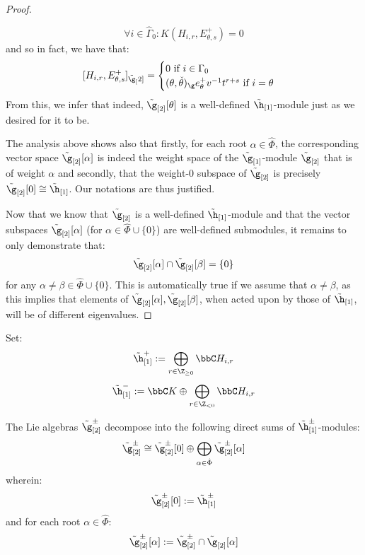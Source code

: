 \begin{proof}
\begin{itemize}
                        $$\forall i \in \hat{\Gamma}_0: K(H_{i, r}, E_{\theta, s}^+) = 0$$
                    and so in fact, we have that:
                        $$
                            [H_{i, r}, E_{\theta, s}^+]_{\tilde{\g}_[2]}
                            =
                            \begin{cases}
                                \text{$0$ if $i \in \Gamma_0$}
                                \\
                                \text{$(\theta, \check{\theta})_{\g} e_{\theta}^+ v^{-1} t^{r + s}$ if $i = \theta$}
                            \end{cases}
                        $$
                    From this, we infer that indeed, $\tilde{\g}_{[2]}[\theta]$ is a well-defined $\tilde{\h}_{[1]}$-module just as we desired for it to be. 
                \end{itemize}

                The analysis above shows also that firstly, for each root $\alpha \in \hat{\Phi}$, the corresponding vector space $\tilde{\g}_{[2]}[\alpha]$ is indeed the weight space of the $\tilde{\g}_{[1]}$-module $\tilde{\g}_{[2]}$ that is of weight $\alpha$ and secondly, that the weight-$0$ subspace of $\tilde{\g}_{[2]}$ is precisely $\tilde{\g}_{[2]}[0] \cong \tilde{\h}_{[1]}$. Our notations are thus justified. 

                Now that we know that $\tilde{\g}_{[2]}$ is a well-defined $\tilde{\h}_{[1]}$-module and that the vector subspaces $\tilde{\g}_{[2]}[\alpha]$ (for $\alpha \in \hat{\Phi} \cup \{0\}$) are well-defined submodules, it remains to only demonstrate that:
                    $$\tilde{\g}_{[2]}[\alpha] \cap \tilde{\g}_{[2]}[\beta] = \{0\}$$
                for any $\alpha \not = \beta \in \hat{\Phi} \cup \{0\}$. This is automatically true if we assume that $\alpha \not = \beta$, as this implies that elements of $\tilde{\g}_{[2]}[\alpha], \tilde{\g}_{[2]}[\beta]$, when acted upon by those of $\tilde{\h}_{[1]}$, will be of different eigenvalues.
            \end{proof}
        \begin{corollary} \label{coro: root_space_decomposition_for_toroidal_lie_algebras}
            Set:
                $$\tilde{\h}_{[1]}^+ := \bigoplus_{r \in \Z_{\geq 0}} \bbC H_{i, r}$$
                $$\tilde{\h}_{[1]}^- := \bbC K \oplus \bigoplus_{r \in \Z_{< 0}} \bbC H_{i, r}$$
        
            The Lie algebras $\tilde{\g}_{[2]}^{\pm}$ decompose into the following direct sums of $\tilde{\h}_{[1]}^{\pm}$-modules:
                $$\tilde{\g}_{[2]}^{\pm} \cong \tilde{\g}_{[2]}^{\pm}[0] \oplus \bigoplus_{\alpha \in \hat{\Phi}} \tilde{\g}_{[2]}^{\pm}[\alpha]$$
            wherein:
                $$\tilde{\g}_{[2]}^{\pm}[0] := \tilde{\h}_{[1]}^{\pm}$$
            and for each root $\alpha \in \hat{\Phi}$:
                $$\tilde{\g}_{[2]}^{\pm}[\alpha] := \tilde{\g}_{[2]}^{\pm} \cap \tilde{\g}_{[2]}[\alpha]$$
        \end{corollary}
